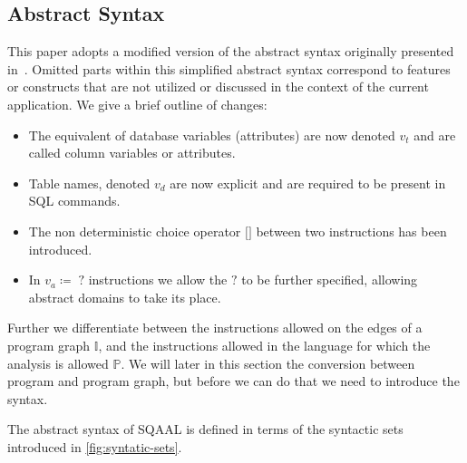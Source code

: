 \subsection{Abstract Syntax} \label{subsec:abstract-syntax}

This paper adopts a modified version of the abstract syntax originally presented in~\cite{cortesi_abstract_2013}.
Omitted parts within this simplified abstract syntax correspond to features or constructs that are not utilized or discussed in the context of the current application.
We give a brief outline of changes:
\begin{itemize}
    \item The equivalent of database variables (attributes) are now denoted $v_t$ and are called column variables or attributes.
    \item Table names, denoted $v_d$ are now explicit and are required to be present in SQL commands.
    \item The non deterministic choice operator $\texttt{[]}$ between two instructions has been introduced.
    \item In $v_a \coloneq \; ?$ instructions we allow the $?$ to be further specified, allowing abstract domains to take its place.
\end{itemize}

Further we differentiate between the instructions allowed on the edges of a program graph $\mathbb{I}$, and the instructions allowed in the language for which the analysis is allowed $\mathbb{P}$.
We will later in this section the conversion between program and program graph, but before we can do that we need to introduce the syntax.

The abstract syntax of SQAAL is defined in terms of the syntactic sets introduced in \autoref{fig:syntatic-sets}.

